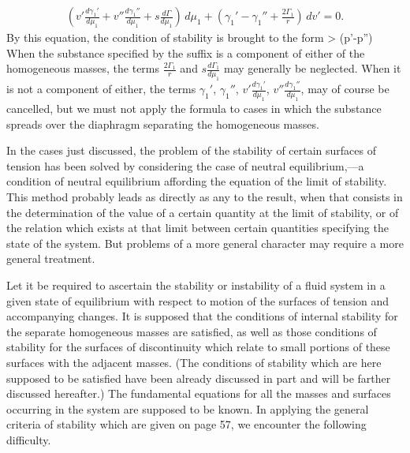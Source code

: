 \documentclass[12pt]{article}
\begin{document}
{\begin{gather}
\left(v' \frac{d\gamma_1'}{d\mu_1} +v'' \frac{d\gamma_1''}{d\mu_1}+ s \frac{d\Gamma}{d\mu_1} \right)\, d\mu_1  +\left( \gamma_1' - \gamma_1'' + \frac{2\Gamma_1}{r} \right)\, dv' = 0. \label{539} \end{gather}
By this equation, the condition of stability is brought to the form
\eqs {} > (p'-p'')   \label{540} \eqe
When the substance specified by the suffix is a component of either
of the homogeneous masses, the terms $\frac{2\Gamma_1}{r}$ and $s\frac{d\Gamma_1}{d\mu_1} $ may generally be neglected. When it is not a component of either, the terms $\gamma_1'$, $\gamma_1''$, $v' \frac{d\gamma_1'}{d\mu_1}$, $v'' \frac{d\gamma_1''}{d\mu_1}$, may of course be cancelled, but we must not apply the formula to cases in which the substance spreads over the diaphragm separating the homogeneous masses.

In the cases just discussed, the problem of the stability of certain surfaces of tension has been solved by considering the case of neutral equilibrium,---a condition of neutral equilibrium affording the equation of the limit of stability. This method probably leads as directly as any to the result, when that consists in the determination of the value of a certain quantity at the limit of stability, or of the relation which exists at that limit between certain quantities specifying the state of the system. But problems of a more general character may require a more general treatment.

Let it be required to ascertain the stability or instability of a fluid system in a given state of equilibrium with respect to motion of the surfaces of tension and accompanying changes. It is supposed that the conditions of internal stability for the separate homogeneous masses are satisfied, as well as those conditions of stability for the surfaces of discontinuity which relate to small portions of these surfaces with the adjacent masses. (The conditions of stability which are here supposed to be satisfied have been already discussed in part and will be farther discussed hereafter.) The fundamental equations for all the masses and surfaces occurring in the system are supposed to be known. In applying the general criteria of stability which are given on page 57, we encounter the following difficulty.

}
\end{document}
